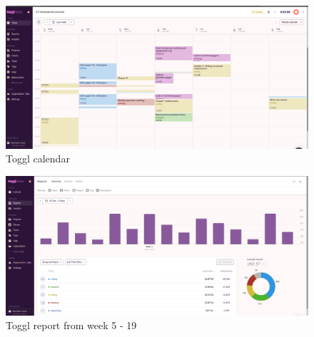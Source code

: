     \begin{figure}[htbp]
      \centering
      \includegraphics[width=1\textwidth]{figures/toggl-calendar.png}
      \caption[]{Toggl calendar}
    \end{figure}
    
    \begin{figure}[htbp]
      \centering
      \includegraphics[width=1\textwidth]{figures/toggl-report.png}
      \caption[]{Toggl report from week 5 - 19}
    \end{figure}
